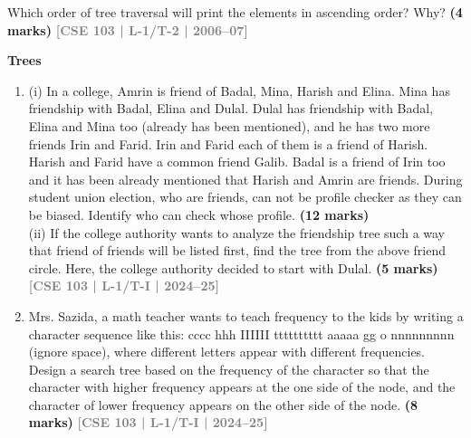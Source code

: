 \documentclass[12pt,a3paper]{article}
\newcommand{\yr}[1]{\hfill\textcolor{gray}{\small\textbf{[#1]}}}
\newcommand{\mk}[1]{\textcolor{orange!70!black}{\small\textbf{(#1 marks)}}}
\newcommand{\subtopic}[2]{%
  \vspace{10pt}
  \noindent\begin{tcolorbox}[colback=#1!8,colframe=#1,boxrule=0.6pt,arc=4pt,
    left=6pt,right=6pt,top=4pt,bottom=4pt]
    \small\bfseries\textcolor{#1}{#2}
  \end{tcolorbox}
  \vspace{2pt}
}
\begin{document}
\begin{enumerate}
\begin{center}
\begin{tikzpicture}
    \end{tikzpicture}
\end{center}

Which order of tree traversal will print the elements in ascending order? Why?
\mk{4} \yr{CSE 103 | L-1/T-2 | 2006--07}

\end{enumerate}

\subtopic{cE}{Trees}
\label{sub:s9-trees}

\begin{enumerate}

\item (i) In a college, Amrin is friend of Badal, Mina, Harish and Elina. Mina has friendship with Badal, Elina and Dulal. Dulal has friendship with Badal, Elina and Mina too (already has been mentioned), and he has two more friends Irin and Farid. Irin and Farid each of them is a friend of Harish. Harish and Farid have a common friend Galib. Badal is a friend of Irin too and it has been already mentioned that Harish and Amrin are friends. During student union election, who are friends, can not be profile checker as they can be biased. Identify who can check whose profile.
\mk{12} \\
(ii) If the college authority wants to analyze the friendship tree such a way that friend of friends will be listed first, find the tree from the above friend circle. Here, the college authority decided to start with Dulal.
\mk{5} \yr{CSE 103 | L-1/T-I | 2024--25}

\item Mrs. Sazida, a math teacher wants to teach frequency to the kids by writing a character sequence like this: cccc hhh IIIIII tttttttttt aaaaa gg o nnnnnnnnn (ignore space), where different letters appear with different frequencies. Design a search tree based on the frequency of the character so that the character with higher frequency appears at the one side of the node, and the character of lower frequency appears on the other side of the node.
\mk{8} \yr{CSE 103 | L-1/T-I | 2024--25}


\end{enumerate}
\end{document}
